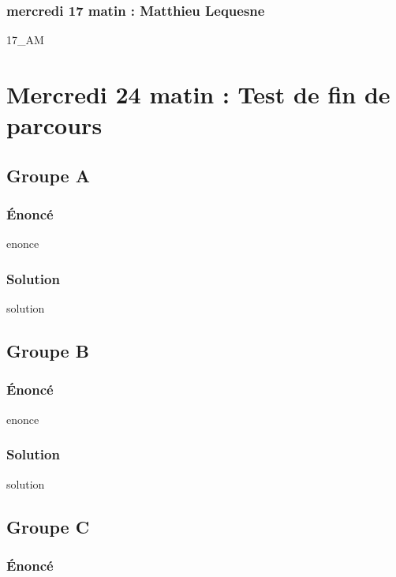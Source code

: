 \documentclass[12pt,A4]{book}
\theoremstyle{definition}
\theoremstyle{thm}
\theoremstyle{def}
\newcounter{sol}[subsection]
\begin{document}
\subsection{mercredi 17 matin : Matthieu Lequesne}

{17_AM}
\fi
\chapter{Mercredi 24 matin : Test de fin de parcours}
\minitoc \bigskip


\section{Groupe A}

\subsection{Énoncé}

{enonce}

\subsection{Solution}

{solution}


\section{Groupe B}

\subsection{Énoncé}

{enonce}

\subsection{Solution}

{solution}



\section{Groupe C}

\subsection{Énoncé}
\end{document}
